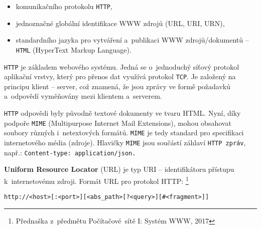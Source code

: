 \documentclass[twoside, 12pt]{article}
\begin{document}
\begin{itemize}
\item komunikačního protokolu \texttt{HTTP},
\item jednoznačné globální identifikace WWW zdrojů (URL, URI, URN),
\item standardního jazyka pro vytváření a~publikaci WWW zdrojů/dokumentů -- \texttt{HTML}
(HyperText Markup Language).
\end{itemize}

\obrazek
{}

\texttt{HTTP} je základem webového systému.
Jedná se o~jednoduchý síťový protokol aplikační vrstvy,
který pro přenos dat využívá protokol \texttt{TCP}.
Je založený na principu klient -- server,
což znamená, že jsou zprávy ve formě požadavků a~odpovědí vyměňovány mezi klientem
a~serverem.

\texttt{HTTP} odpovědi byly původně textové dokumenty ve tvaru HTML.
Nyní, díky podpoře \texttt{MIME} (Multipurpose Internet Mail Extensions),
mohou obsahovat soubory různých i~netextových formátů.
\texttt{MIME} je tedy standard pro specifikaci internetového média (zdroje).
Hlavičky \texttt{MIME} jsou součástí záhlaví \texttt{HTTP zpráv}, např.: \texttt{Content-type:~application/json.}

\textbf{Uniform Resource Locator} (URL) je typ URI -- identifikátoru přístupu k~internetovému zdroji.
Formát URL pro protokol HTTP:
\footnote{Přednaška z~předmětu Počítačové~sítě I: Systém WWW, 2017}

\bigskip
\texttt{http://<host>[:<port>][<abs\_path>[?<query>][\#<fragment>]]}

\bigskip
\end{document}
